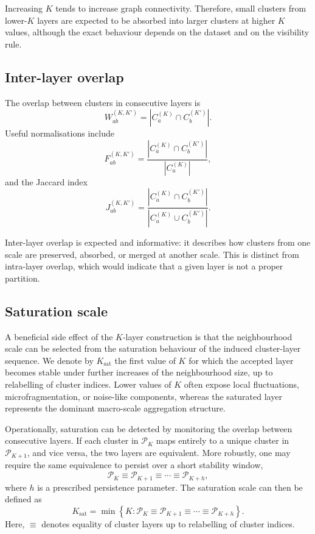 \documentclass[pdflatex,sn-mathphys-num]{sn-jnl}
\newcommand{\calP}{\mathcal{P}}
\begin{document}
Increasing $K$ tends to increase graph connectivity. Therefore, small clusters from lower-$K$ layers are expected to be absorbed into larger clusters at higher $K$ values, although the exact behaviour depends on the dataset and on the visibility rule.

\subsection{Inter-layer overlap}

The overlap between clusters in consecutive layers is
\begin{equation}
W_{ab}^{(K,K')}=|C_a^{(K)}\cap C_b^{(K')}|.
\label{eq:overlap_count}
\end{equation}
Useful normalisations include
\begin{equation}
F_{ab}^{(K,K')}=\frac{|C_a^{(K)}\cap C_b^{(K')}|}{|C_a^{(K)}|},
\label{eq:frac_from}
\end{equation}
and the Jaccard index
\begin{equation}
J_{ab}^{(K,K')}=\frac{|C_a^{(K)}\cap C_b^{(K')}|}{|C_a^{(K)}\cup C_b^{(K')}|}.
\label{eq:jaccard}
\end{equation}

Inter-layer overlap is expected and informative: it describes how clusters from one scale are preserved, absorbed, or merged at another scale. This is distinct from intra-layer overlap, which would indicate that a given layer is not a proper partition.

\subsection{Saturation scale}

A beneficial side effect of the $K$-layer construction is that the neighbourhood scale can be selected from the saturation behaviour of the induced cluster-layer sequence. We denote by $K_{\mathrm{sat}}$ the first value of $K$ for which the accepted layer becomes stable under further increases of the neighbourhood size, up to relabelling of cluster indices. Lower values of $K$ often expose local fluctuations, microfragmentation, or noise-like components, whereas the saturated layer represents the dominant macro-scale aggregation structure.

Operationally, saturation can be detected by monitoring the overlap between consecutive layers. If each cluster in $\calP_K$ maps entirely to a unique cluster in $\calP_{K+1}$, and vice versa, the two layers are equivalent. More robustly, one may require the same equivalence to persist over a short stability window,
\begin{equation}
\calP_K \equiv \calP_{K+1}\equiv\cdots\equiv\calP_{K+h},
\label{eq:partition_stability_window}
\end{equation}
where $h$ is a prescribed persistence parameter. The saturation scale can then be defined as
\begin{equation}
K_{\mathrm{sat}}=
\min\left\{
K:\calP_K \equiv \calP_{K+1}\equiv\cdots\equiv\calP_{K+h}
\right\}.
\label{eq:ksat}
\end{equation}
Here, $\equiv$ denotes equality of cluster layers up to relabelling of cluster indices.
\end{document}
